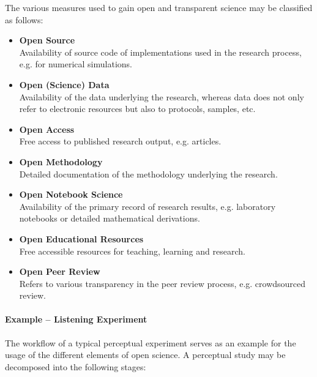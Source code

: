 \documentclass[a4paper, 10pt, twocolumn]{article}
\begin{document}
The various measures used to gain open and transparent science may be classified as
follows:
\begin{itemize}
\item \textbf{Open Source}\\
Availability of source code of implementations used in the research process, e.g. for numerical simulations.
%
\item \textbf{Open (Science) Data}\\
Availability of the data underlying the research, whereas data does not only refer to electronic resources but also
to protocols, samples, etc.
%
\item \textbf{Open Access}\\
Free access to published research output, e.g. articles.
%
\item \textbf{Open Methodology}\\
Detailed documentation of the methodology underlying the research.
%
\item \textbf{Open Notebook Science}\\
Availability of the primary record of research results, e.g. laboratory notebooks or detailed mathematical derivations.
%
\item \textbf{Open Educational Resources}\\
Free accessible resources for teaching, learning and research.
\item \textbf{Open Peer Review}~\cite{Ford13:LFP}\\
Refers to various transparency in the peer review process, e.g. crowdsourced review.
\end{itemize}


\paragraph*{Example -- Listening Experiment}

The workflow of a typical perceptual experiment serves as an example for the usage of 
the different elements of open science. A perceptual study may be decomposed into the
following stages:
\end{document}
